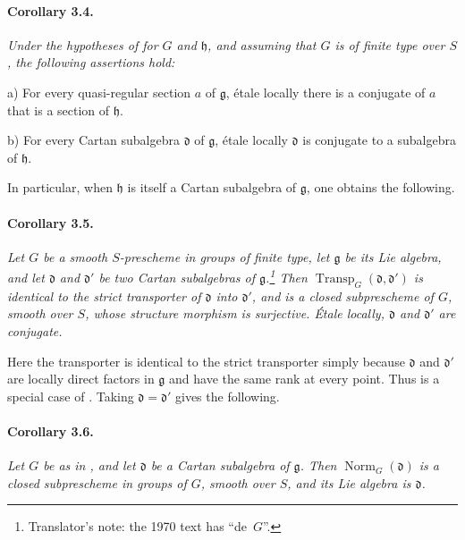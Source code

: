 
\paragraph{\textbf{Corollary 3.4.}}
{\itshape Under the hypotheses of  for \(G\) and
\(\mathfrak h\), and assuming that \(G\) is of finite type over
\(S\), the following assertions hold:

\smallskip
\noindent
\textup{a)}
For every quasi-regular section \(a\) of \(\mathfrak g\), étale
locally there is a conjugate of \(a\) that is a section of
\(\mathfrak h\).

\smallskip
\noindent
\textup{b)}
For every Cartan subalgebra \(\mathfrak d\) of \(\mathfrak g\),
étale locally \(\mathfrak d\) is conjugate to a subalgebra of
\(\mathfrak h\).}

In particular, when \(\mathfrak h\) is itself a Cartan subalgebra
of \(\mathfrak g\), one obtains the following.

\paragraph{\textbf{Corollary 3.5.}}
{\itshape Let \(G\) be a smooth \(S\)-prescheme in groups of finite
type, let \(\mathfrak g\) be its Lie algebra, and let
\(\mathfrak d\) and \(\mathfrak d'\) be two Cartan subalgebras of
\(\mathfrak g\).\footnote{Translator's note: the 1970 text has ``de~\(G\)''.} Then
\(\operatorname{Transp}_G(\mathfrak d,\mathfrak d')\) is identical
to the strict transporter of \(\mathfrak d\) into
\(\mathfrak d'\), and is a closed subprescheme of \(G\), smooth
over \(S\), whose structure morphism is surjective. Étale locally,
\(\mathfrak d\) and \(\mathfrak d'\) are conjugate.}

Here the transporter is identical to the strict transporter simply
because \(\mathfrak d\) and \(\mathfrak d'\) are locally direct
factors in \(\mathfrak g\) and have the same rank at every point.
Thus  is a special case of . Taking
\(\mathfrak d=\mathfrak d'\) gives the following.

\paragraph{\textbf{Corollary 3.6.}}
{\itshape Let \(G\) be as in , and let \(\mathfrak d\) be a
Cartan subalgebra of \(\mathfrak g\). Then
\(\operatorname{Norm}_G(\mathfrak d)\) is a closed subprescheme in
groups of \(G\), smooth over \(S\), and its Lie algebra is
\(\mathfrak d\).}

